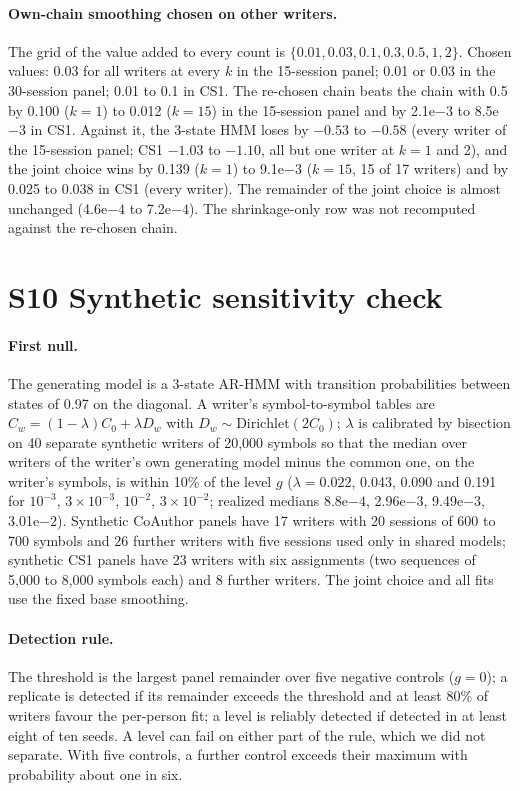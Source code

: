 \documentclass[10pt]{article}
\newcommand{\e}[2]{#1e$#2$}
\newcommand{\hmmthree}{\mbox{3-state} HMM}
\newcommand{\arthree}{\mbox{3-state} \mbox{AR-HMM}}
\newcommand{\Ssec}[2]{\section*{S#1\texorpdfstring{\quad}{ } #2}\addcontentsline{toc}{section}{S#1\texorpdfstring{\quad}{ } #2}\label{S#1}}
\begin{document}
\paragraph{Own-chain smoothing chosen on other writers.} The grid of the value added to every count is $\{0.01, 0.03, 0.1, 0.3, 0.5, 1, 2\}$. Chosen values: 0.03 for all writers at every $k$ in the 15-session panel; 0.01 or 0.03 in the 30-session panel; 0.01 to 0.1 in CS1. The re-chosen chain beats the chain with 0.5 by 0.100 ($k=1$) to 0.012 ($k=15$) in the 15-session panel and by \e{2.1}{-3} to \e{8.5}{-3} in CS1. Against it, the \hmmthree{} loses by $-0.53$ to $-0.58$ (every writer of the 15-session panel; CS1 $-1.03$ to $-1.10$, all but one writer at $k=1$ and 2), and the joint choice wins by 0.139 ($k=1$) to \e{9.1}{-3} ($k=15$, 15 of 17 writers) and by 0.025 to 0.038 in CS1 (every writer). The remainder of the joint choice is almost unchanged (\e{4.6}{-4} to \e{7.2}{-4}). The shrinkage-only row was not recomputed against the re-chosen chain.

\Ssec{10}{Synthetic sensitivity check}

\paragraph{First null.} The generating model is a \arthree{} with transition probabilities between states of 0.97 on the diagonal. A writer's symbol-to-symbol tables are $C_w=(1-\lambda)C_0+\lambda D_w$ with $D_w\sim\text{Dirichlet}(2C_0)$; $\lambda$ is calibrated by bisection on 40 separate synthetic writers of 20,000 symbols so that the median over writers of the writer's own generating model minus the common one, on the writer's symbols, is within 10\% of the level $g$ ($\lambda=0.022$, 0.043, 0.090 and 0.191 for $10^{-3}$, $3\times10^{-3}$, $10^{-2}$, $3\times10^{-2}$; realized medians \e{8.8}{-4}, \e{2.96}{-3}, \e{9.49}{-3}, \e{3.01}{-2}). Synthetic CoAuthor panels have 17 writers with 20 sessions of 600 to 700 symbols and 26 further writers with five sessions used only in shared models; synthetic CS1 panels have 23 writers with six assignments (two sequences of 5,000 to 8,000 symbols each) and 8 further writers. The joint choice and all fits use the fixed base smoothing.

\paragraph{Detection rule.} The threshold is the largest panel remainder over five negative controls ($g=0$); a replicate is detected if its remainder exceeds the threshold and at least 80\% of writers favour the per-person fit; a level is reliably detected if detected in at least eight of ten seeds. A level can fail on either part of the rule, which we did not separate. With five controls, a further control exceeds their maximum with probability about one in six.
\end{document}
